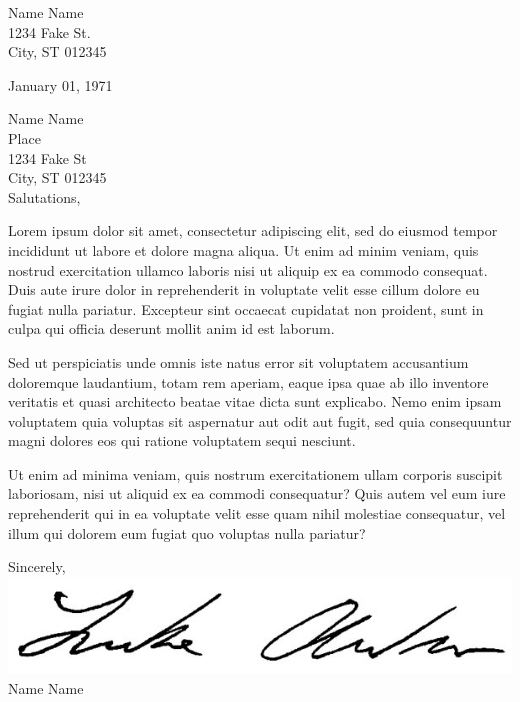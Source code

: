 \documentclass{structure} %
\begin{document}
\begin{flushright}
Name Name \\
1234 Fake St. \\
City, ST 012345
\end{flushright}
\vspace*{2\baselineskip} %
January 01, 1971

Name Name \\
Place \\
1234 Fake St \\
City, ST 012345 \\

Salutations,


Lorem ipsum dolor sit amet, consectetur adipiscing elit, sed do eiusmod tempor incididunt ut labore et dolore magna aliqua. Ut enim ad minim veniam, quis nostrud exercitation ullamco laboris nisi ut aliquip ex ea commodo consequat. Duis aute irure dolor in reprehenderit in voluptate velit esse cillum dolore eu fugiat nulla pariatur. Excepteur sint occaecat cupidatat non proident, sunt in culpa qui officia deserunt mollit anim id est laborum.

Sed ut perspiciatis unde omnis iste natus error sit voluptatem accusantium doloremque laudantium, totam rem aperiam, eaque ipsa quae ab illo inventore veritatis et quasi architecto beatae vitae dicta sunt explicabo. Nemo enim ipsam voluptatem quia voluptas sit aspernatur aut odit aut fugit, sed quia consequuntur magni dolores eos qui ratione voluptatem sequi nesciunt.

Ut enim ad minima veniam, quis nostrum exercitationem ullam corporis suscipit laboriosam, nisi ut aliquid ex ea commodi consequatur? Quis autem vel eum iure reprehenderit qui in ea voluptate velit esse quam nihil molestiae consequatur, vel illum qui dolorem eum fugiat quo voluptas nulla pariatur?

Sincerely, \\
\includegraphics{signature} \\
Name Name
\end{document}

